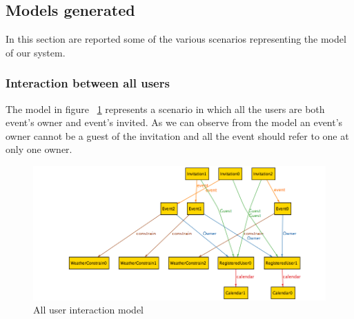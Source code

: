\newpage
\subsection{Models generated}
In this section are reported some of the various scenarios representing the model of our system.
\subsubsection{Interaction between all users}
The model in figure ~\ref{fig:allint} represents a scenario in which all the users are both event's owner and event's invited. As we can observe from the model an  event's owner cannot be a guest of the invitation and all the event should refer to one at only one owner.
\begin{center}
 \begin{figure}[H]
    \includegraphics[width=1\textwidth,height=0.5\textwidth]{../Alloy/allInteration.png}
    \caption{All user interaction model}
     \label{fig:allint}
     \end{figure}
   \end{center} 
